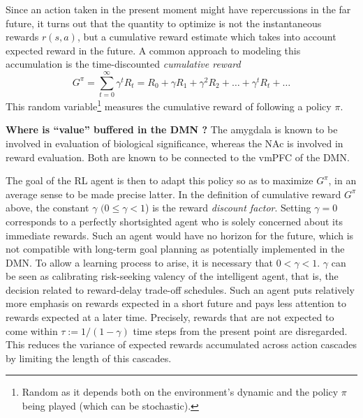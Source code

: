\documentclass[10pt,letterpaper]{article}
\begin{document}
Since an action taken in the present moment might have repercussions in the far future, it turns out that the
quantity to optimize is not the instantaneous rewards $r(s, a)$, but a
cumulative reward estimate which takes into account expected reward in the future.
A common approach to
modeling this accumulation is the time-discounted \textit{cumulative reward}%
\begin{equation}
  \label{eq:cumr}
  G^\pi = \sum_{t=0}^{\infty}\gamma^{t}R_t = R_0 + \gamma R_1 + \gamma^2 R_2 + \ldots + \gamma^tR_t + \ldots
\end{equation}
This random variable\footnote{Random as it depends both on the environment's dynamic and the
  policy $\pi$ being played (which can be stochastic).}  measures the cumulative reward of
following a policy $\pi$.
\begin{mdframed}
  \textbf{Where is ``value'' buffered in the DMN ?
    }
  The amygdala is known to be involved in evaluation of biological significance,
  whereas
  the NAc is involved in reward evaluation. Both are known to
  be connected to the vmPFC of the DMN.
\end{mdframed}
  The goal of the RL agent is then to adapt this policy so as to  maximize $G^\pi$, in an average sense to be made precise latter. In
  the definition of cumulative reward $G^\pi$ above, the constant $\gamma$ $(0 \le \gamma < 1$) is the reward \textit{discount factor}.
Setting $\gamma = 0$ corresponds to a perfectly shortsighted agent who is solely concerned about its immediate rewards.
Such an agent would have no horizon for the future,
which is not compatible with long-term goal planning
as potentially implemented in the DMN.
To allow a learning process to arise,
it is necessary that $0 < \gamma < 1$.
$\gamma$ can be seen as calibrating risk-seeking valency of the intelligent agent,
that is, the decision related to reward-delay trade-off schedules.
Such an agent puts relatively more emphasis on rewards expected in
a short future and pays less attention to
rewards expected at a later time. Precisely, rewards that are not expected to come within $\tau := 1/(1 - \gamma)$ time steps from the present point are disregarded.
This reduces the variance of expected rewards accumulated across action cascades by limiting the length of this cascades.
\end{document}
